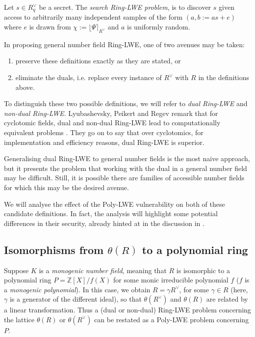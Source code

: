 \documentclass{llncs}
\newcommand{\ZZ}{\mathbb{Z}}
\newcommand{\<}{\langle}
\renewcommand{\>}{\rangle}
\begin{document}
\begin{definition}
        Let $s \in R_q^\vee$ be a secret.  The \emph{search Ring-LWE problem}, is to discover $s$ given access to arbitrarily many independent samples of the form $(a, b:=as +e )$ where $e$ is drawn from $\chi := \lfloor \Psi \rceil_{R^\vee}$ and $a$ is uniformly random.
\end{definition}

In proposing general number field Ring-LWE, one of two avenues may be taken:
\begin{enumerate}
        \item preserve these definitions exactly as they are stated, or
        \item eliminate the duals, i.e. replace every instance of $R^\vee$ with $R$ in the definitions above.
\end{enumerate}

To distinguish these two possible definitions, we will refer to \emph{dual Ring-LWE} and \emph{non-dual Ring-LWE}.
Lyubashevsky, Peikert and Regev remark that for cyclotomic fields, dual and non-dual Ring-LWE lead to computationally equivalent problems \cite[Section 3.3]{LPR10}.  They go on to say that over cyclotomics, for implementation and efficiency reasons, dual Ring-LWE is superior.

Generalising dual Ring-LWE to general number fields is the most naive approach, but it presents the problem that working with the dual in a general number field may be difficult.  Still, it is possible there are families of accessible number fields for which this may be the desired avenue.

We will analyse the effect of the Poly-LWE vulnerability on both of these candidate definitions.  In fact, the analysis will highlight some potential differences in their security, already hinted at in the discussion in \cite[Section 3.3]{LPR10}.



\subsection{Isomorphisms from $\theta(R)$ to a polynomial ring}

Suppose $K$ is a \emph{monogenic number field}, meaning that
$R$ is isomorphic to a polynomial ring $P = \ZZ[X]/f(X)$ for some monic irreducible polynomial $f$  ($f$ is a \emph{monogenic polynomial}). In this case, we obtain $R = \gamma R^\vee$, for some $\gamma \in R$ (here, $\gamma$ is a generator of the different ideal), so that $\theta(R^\vee)$ and $\theta(R)$ are related by a linear transformation.  Thus a (dual or non-dual) Ring-LWE problem concerning the lattice $\theta(R)$ or $\theta(R^\vee)$ can be restated as a Poly-LWE problem concerning $P$.
\end{document}
